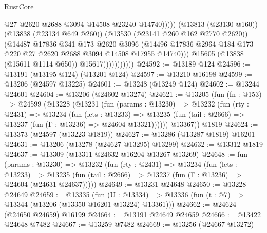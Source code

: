 \begin{lexlean}{RustCore}
\begin{coremodule}
                                      @27
                                      @2620
                                      @2688
                                      @3094
                                      @14508
                                      @23240
                                      @14740)))))
                            (@13813 (@23130 @160))
                            (@13838 (@23134 @649 @260))
                            (@13530 (@23141 @260 @162 @2770 @2620))
                            (@14487
                              @17836
                              @341
                              @173
                              @2620
                              @3096
                              (@14496
                                @17836
                                @2964
                                @184
                                @173
                                @220
                                @27
                                @2620
                                @2688
                                @3094
                                @14508
                                @17955
                                @14740)))
                          @15605
                          (@13838 (@15611 @1114 @650))
                          @15617)))))))))))
@24592 := @13189 @124
@24596 := @13191 (@13195 @124) (@13201 @124)
@24597 := @13210 @16198
@24599 := @13206 (@24597 @13225)
@24601 := @13248 (@13249 @124)
@24602 := @13244 @24601
@24604 := @13206 (@24602 @13274)
@24621 := @13205
    (fun (fn : @153) =>
    @24599
      (@13228
        (@13231
          (fun (params : @13230) =>
          @13232
            (fun (rty : @2431) =>
            @13234
              (fun (lets : @13233) =>
              @13235 (fun (tail : @2666) => @13237 (fun (Γ : @13236) => @24604 @13321))))))
        @13367))
    @1819
@24624 := @13373 (@24597 (@13223 @1819))
@24627 := @13286 (@13287 @1819) @16201
@24631 := @13206 (@13278 (@24627 @13295) @13299)
@24632 := @13312 @1819
@24637 := @13309 (@13311 @24632 @16204 @13267 @13269)
@24648 := fun (params : @13230) =>
  @13232
    (fun (rty : @2431) =>
    @13234
      (fun (lets : @13233) =>
      @13235 (fun (tail : @2666) => @13237 (fun (Γ : @13236) => @24604 (@24631 @24637)))))
@24649 := @13231 @24648
@24650 := @13228 @24649
@24659 := @13335
    (fun (U : @13334) => @13336 (fun (t : @7) => @13344 (@13206 (@13350 @16201 @13224) @13361)))
@24662 := @24624 (@24650 @24659) @16199
@24664 := @13191 @24649 @24659
@24666 := @13422 @24648 @7482
@24667 := @13259 @7482
@24669 := @13256 (@24667 @13272)

\end{coremodule}
\end{lexlean}
